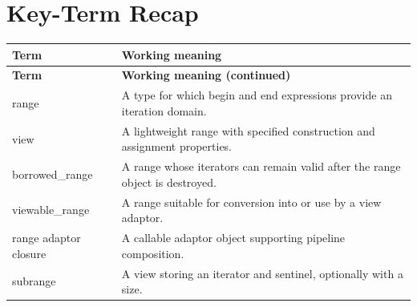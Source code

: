 \documentclass[11pt,letterpaper]{article}
\begin{document}
\section{Key-Term Recap}
\begin{longtable}{@{}>{\RaggedRight\arraybackslash}p{}>{\RaggedRight\arraybackslash}p{}@{}}\toprule\textbf{Term} & \textbf{Working meaning}\\\midrule\endfirsthead\toprule\textbf{Term} & \textbf{Working meaning (continued)}\\\midrule\endhead\bottomrule\endfoot
range & A type for which begin and end expressions provide an iteration domain.\\
view & A lightweight range with specified construction and assignment properties.\\
borrowed\_\allowbreak{}range & A range whose iterators can remain valid after the range object is destroyed.\\
viewable\_\allowbreak{}range & A range suitable for conversion into or use by a view adaptor.\\
range adaptor closure & A callable adaptor object supporting pipeline composition.\\
subrange & A view storing an iterator and sentinel, optionally with a size.\\
\end{longtable}
\end{document}
